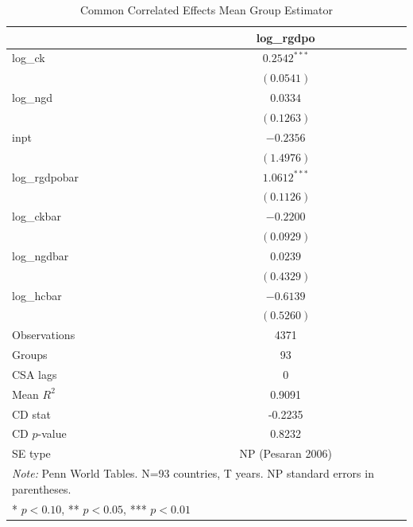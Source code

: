 
\begin{table}[htbp]
  \centering
  \caption{Common Correlated Effects Mean Group Estimator}
  \label{tab:results}
  \begin{tabular}{lcc}
  \hline\hline
  & \multicolumn{1}{c}{log_rgdpo} \\
  \hline
  log\_ck                        & $0.2542^{***}$ \\
                                 & $(0.0541)$ \\[4pt]
  log\_ngd                       & $0.0334$ \\
                                 & $(0.1263)$ \\[4pt]
  inpt                           & $-0.2356$ \\
                                 & $(1.4976)$ \\[4pt]
  log\_rgdpobar                  & $1.0612^{***}$ \\
                                 & $(0.1126)$ \\[4pt]
  log\_ckbar                     & $-0.2200$ \\
                                 & $(0.0929)$ \\[4pt]
  log\_ngdbar                    & $0.0239$ \\
                                 & $(0.4329)$ \\[4pt]
  log\_hcbar                     & $-0.6139$ \\
                                 & $(0.5260)$ \\[4pt]
  \hline
  Observations        & 4371 \\
  Groups              & 93 \\
  CSA lags            & 0 \\
  Mean $R^2$          & 0.9091 \\
  CD stat             & -0.2235 \\
  CD $p$-value        & 0.8232 \\
  SE type             & NP (Pesaran 2006) \\
  \hline\hline
  \multicolumn{2}{l}{\textit{Note:} Penn World Tables. N=93 countries, T\approx 50 years. NP standard errors in parentheses.}
  \\
  \multicolumn{2}{l}{* $p<0.10$, ** $p<0.05$, *** $p<0.01$} \\
  \end{tabular}
\end{table}
